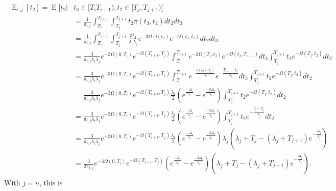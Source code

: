 \documentclass{article}
\DeclareMathOperator{\E}{E}
\begin{document}
\begin{align}
    \begin{split}
        \E_{i,j}[t_2] = \E\big[t_2|&t_3 \in [T_i T_{i+1}),t_2 \in [T_j,T_{j+1}) \big]\\
        &= \frac{1}{\pi_{i,j}}\int_{T_i}^{T_{i+1}}\int_{T_j}^{T_{j+1}}t_2\pi(t_3,t_2)dt_2dt_3\\
        &= \frac{1}{\pi_{i,j}}\int_{T_i}^{T_{i+1}}\int_{T_j}^{T_{j+1}}
            \frac{3t_2}{\lambda_i \lambda_j}e^{-3\Omega(0,t_3)}e^{-\Omega(t_3,t_2)}dt_2dt_3\\
        &= \frac{3}{\pi_{i,j}\lambda_i\lambda_j}e^{-3\Omega(0,T_i)}e^{-\Omega(T_{i+1},T_j)}
            \int_{T_i}^{T_{i+1}}e^{-3\Omega(T_i,t_3)}e^{-\Omega(t_3,T_{i+1})}dt_3
            \int_{T_j}^{T_{j+1}}t_2e^{-\Omega(T_j,t_2)}dt_2\\
        &= \frac{3}{\pi_{i,j}\lambda_i\lambda_j}e^{-3\Omega(0,T_i)}e^{-\Omega(T_{i+1},T_j)}
            \int_{T_i}^{T_{i+1}}e^{-\frac{3(t_3-T_i)}{\lambda_i}}e^{-\frac{T_{i+1}-t_3}{\lambda_i}}dt_3
            \int_{T_j}^{T_{j+1}}t_2e^{-\Omega(T_j,t_2)}dt_2\\
        &= \frac{3}{\pi_{i,j}\lambda_i\lambda_j}e^{-3\Omega(0,T_i)}e^{-\Omega(T_{i+1},T_j)}
            \frac{\lambda_i}{2} \left(e^{\frac{-\Delta_i}{\lambda_i}}-e^{\frac{-3\Delta_i}{\lambda_i}}\right)
            \int_{T_j}^{T_{j+1}}t_2e^{-\Omega(T_j,t_2)}dt_2\\
        &= \frac{3}{\pi_{i,j}\lambda_i\lambda_j}e^{-3\Omega(0,T_i)}e^{-\Omega(T_{i+1},T_j)}
            \frac{\lambda_i}{2} \left(e^{\frac{-\Delta_i}{\lambda_i}}-e^{\frac{-3\Delta_i}{\lambda_i}}\right)
            \int_{T_j}^{T_{j+1}}t_2e^{-\frac{t_2-T_j}{\lambda_j}}dt_2\\
        &= \frac{3}{\pi_{i,j}\lambda_i\lambda_j}e^{-3\Omega(0,T_i)}e^{-\Omega(T_{i+1},T_j)}
            \frac{\lambda_i}{2} \left(e^{\frac{-\Delta_i}{\lambda_i}}-e^{\frac{-3\Delta_i}{\lambda_i}}\right)
            \lambda_j\left(\lambda_j+T_j-(\lambda_j +T_{j+1}) e^{-\frac{\Delta_j}{\lambda_j}}\right)\\
        &= \frac{3}{2\pi_{i,j}}e^{-3\Omega(0,T_i)}e^{-\Omega(T_{i+1},T_j)}
            \left(e^{\frac{-\Delta_i}{\lambda_i}}-e^{\frac{-3\Delta_i}{\lambda_i}}\right)
            \left(\lambda_j+T_j-(\lambda_j + T_{j+1}) e^{-\frac{\Delta_j}{\lambda_j}}\right).
    \end{split}
    \label{eq:Et2}
\end{align}
With $j=n$, this is 
\end{document}
